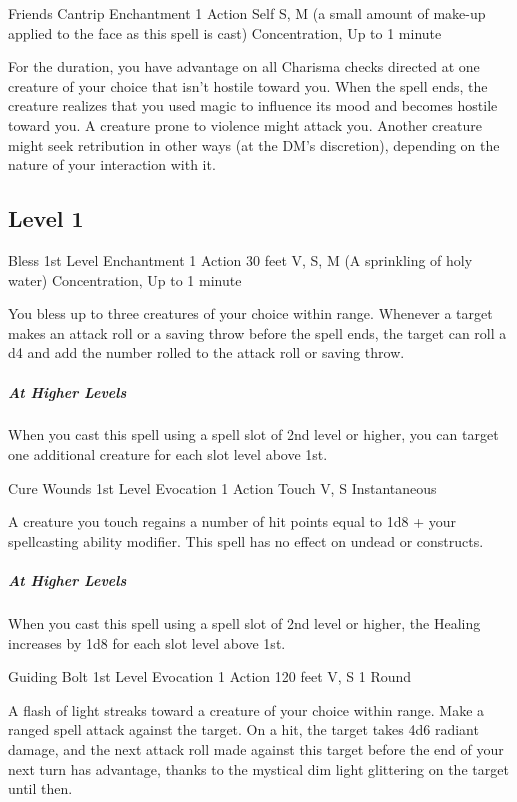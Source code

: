 \documentclass[letterpaper,openany,oneside,twocolumn]{book}
\begin{document}
\DndSpellHeader
  {Friends}
  {Cantrip Enchantment}
  {1 Action}
  {Self}
  {S, M (a small amount of make-up applied to the face as this spell is cast)}
  {Concentration, Up to 1 minute}
  
For the duration, you have advantage on all Charisma checks directed at one creature of your choice that isn't hostile toward you. When the spell ends, the creature realizes that you used magic to influence its mood and becomes hostile toward you. A creature prone to violence might attack you. Another creature might seek retribution in other ways (at the DM's discretion), depending on the nature of your interaction with it.

\subsection*{Level 1}

\DndSpellHeader
  {Bless}
  {1st Level Enchantment}
  {1 Action}
  {30 feet}
  {V, S, M (A sprinkling of holy water)}
  {Concentration, Up to 1 minute}
  
You bless up to three creatures of your choice within range. Whenever a target makes an attack roll or a saving throw before the spell ends, the target can roll a d4 and add the number rolled to the attack roll or saving throw.

\subparagraph*{At Higher Levels} When you cast this spell using a spell slot of 2nd level or higher, you can target one additional creature for each slot level above 1st.

\DndSpellHeader
  {Cure Wounds}
  {1st Level Evocation}
  {1 Action}
  {Touch}
  {V, S}
  {Instantaneous}
  
A creature you touch regains a number of hit points equal to 1d8 + your spellcasting ability modifier. This spell has no effect on undead or constructs.

\subparagraph*{At Higher Levels} When you cast this spell using a spell slot of 2nd level or higher, the Healing increases by 1d8 for each slot level above 1st.

\DndSpellHeader
  {Guiding Bolt}
  {1st Level Evocation}
  {1 Action}
  {120 feet}
  {V, S}
  {1 Round}
  
A flash of light streaks toward a creature of your choice within range. Make a ranged spell attack against the target. On a hit, the target takes 4d6 radiant damage, and the next attack roll made against this target before the end of your next turn has advantage, thanks to the mystical dim light glittering on the target until then.
\end{document}

